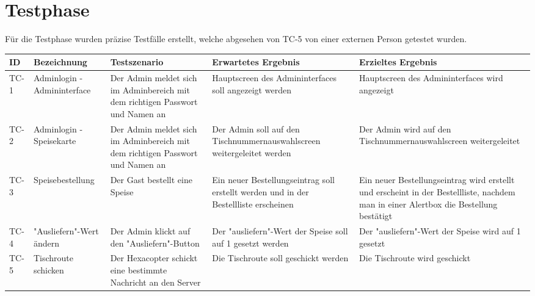 \chapter{Testphase}
\renewcommand{\kapitelautor}{Katharina Joksch}
Für die Testphase wurden präzise Testfälle erstellt, welche abgesehen von TC-5 von einer externen Person getestet wurden.

\begin{table}[H]
\centering
\begin{tabular}{|p{1cm}|p{3cm}|p{3cm}|p{3cm}|p{3cm}|} 
\hline \textbf{ID} & \textbf{Bezeichnung} & \textbf{Testszenario} & \textbf{Erwartetes Ergebnis} & \textbf{Erzieltes Ergebnis} \\\hline
\hline TC-1 & Adminlogin - Admininterface & Der Admin meldet sich im Adminbereich mit dem richtigen Passwort und Namen an & Hauptscreen des Admininterfaces soll angezeigt werden & Hauptscreen des Admininterfaces wird angezeigt \\\hline
\hline TC-2 & Adminlogin - Speisekarte & Der Admin meldet sich im Adminbereich mit dem richtigen Passwort und Namen an & Der Admin soll auf den Tischnummernauswahlscreen weitergeleitet werden & Der Admin wird auf den Tischnummernauswahlscreen weitergeleitet \\\hline
\hline TC-3 & Speisebestellung & Der Gast bestellt eine Speise & Ein neuer Bestellungseintrag soll erstellt werden und in der Bestellliste erscheinen & Ein neuer Bestellungseintrag wird erstellt und erscheint in der Bestellliste, nachdem man in einer Alertbox die Bestellung bestätigt \\\hline
\hline TC-4 & "Ausliefern"-Wert ändern & Der Admin klickt auf den "Ausliefern"-Button & Der "ausliefern"-Wert der Speise soll auf 1 gesetzt werden & Der "ausliefern"-Wert der Speise wird auf 1 gesetzt \\\hline
\hline TC-5 & Tischroute schicken & Der Hexacopter schickt eine bestimmte Nachricht an den Server & Die Tischroute soll geschickt werden & Die Tischroute wird geschickt \\\hline
\end{tabular}
\end{table}
